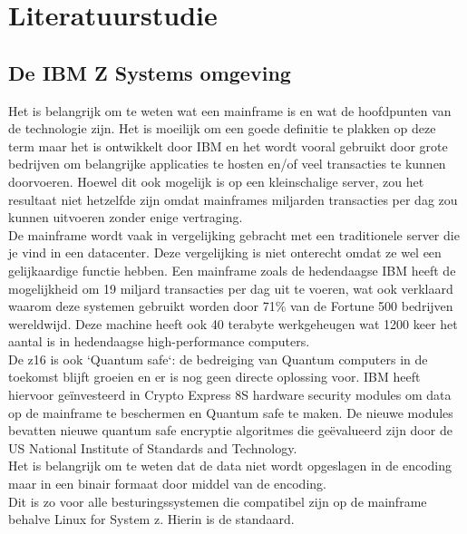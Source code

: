 
\chapter{Literatuurstudie}
\label{ch:literatuurstudie}

\section{De IBM Z Systems omgeving}
\label{sec:De IBM Z Systems omgeving}
Het is belangrijk om te weten wat een mainframe is en wat de hoofdpunten van de technologie zijn. Het is moeilijk om een goede definitie te plakken op deze term maar het is ontwikkelt door IBM en het wordt vooral gebruikt door grote bedrijven om belangrijke applicaties te hosten en/of veel transacties te kunnen doorvoeren. Hoewel dit ook mogelijk is op een kleinschalige server, zou het resultaat niet hetzelfde zijn omdat mainframes miljarden transacties per dag zou kunnen uitvoeren zonder enige vertraging. \autocite{BasuMallick2023} \\

De mainframe wordt vaak in vergelijking gebracht met een traditionele server die je vind in een datacenter. Deze vergelijking is niet onterecht omdat ze wel een gelijkaardige functie hebben. Een mainframe zoals de hedendaagse IBM  heeft de mogelijkheid om 19 miljard transacties per dag uit te voeren, wat ook verklaard waarom deze systemen gebruikt worden door 71\% van de Fortune 500 bedrijven wereldwijd. Deze machine heeft ook 40 terabyte werkgeheugen wat 1200 keer het aantal is in hedendaagse high-performance computers. \autocite{Tozzi2022} \\

De \Gls{z16} is ook `Quantum safe`: de bedreiging van Quantum computers in de toekomst blijft groeien en er is nog geen directe oplossing voor. IBM heeft hiervoor geïnvesteerd in Crypto Express 8S hardware security modules om data op de mainframe te beschermen en Quantum safe te maken. De nieuwe modules bevatten nieuwe quantum safe encryptie algoritmes die geëvalueerd zijn door de US National Institute of Standards and Technology. \autocite{Sayer2022} \\

Het is belangrijk om te weten dat de data niet wordt opgeslagen in de  encoding maar in een binair formaat door middel van de  encoding. \autocite{Singhal2023} \\ Dit is zo voor alle besturingssystemen die compatibel zijn op de mainframe behalve Linux for System z. Hierin is  de standaard. \autocite{IBMb}


